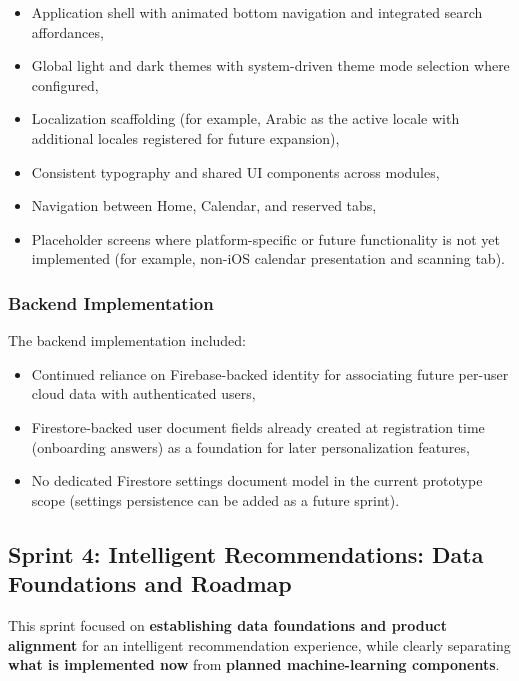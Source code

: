 \begin{itemize}
    \item Application shell with animated bottom navigation and integrated search affordances,
    \item Global light and dark themes with system-driven theme mode selection where configured,
    \item Localization scaffolding (for example, Arabic as the active locale with additional locales registered for future expansion),
    \item Consistent typography and shared UI components across modules,
    \item Navigation between Home, Calendar, and reserved tabs,
    \item Placeholder screens where platform-specific or future functionality is not yet implemented (for example, non-iOS calendar presentation and scanning tab).
\end{itemize}

\subsubsection{Backend Implementation}

The backend implementation included:

\begin{itemize}
    \item Continued reliance on Firebase-backed identity for associating future per-user cloud data with authenticated users,
    \item Firestore-backed user document fields already created at registration time (onboarding answers) as a foundation for later personalization features,
    \item No dedicated Firestore settings document model in the current prototype scope (settings persistence can be added as a future sprint).
\end{itemize}

\subsection{Sprint 4: Intelligent Recommendations: Data Foundations and Roadmap}

This sprint focused on \textbf{establishing data foundations and product alignment} for
an intelligent recommendation experience, while clearly separating \textbf{what is
implemented now} from \textbf{planned machine-learning components}.

